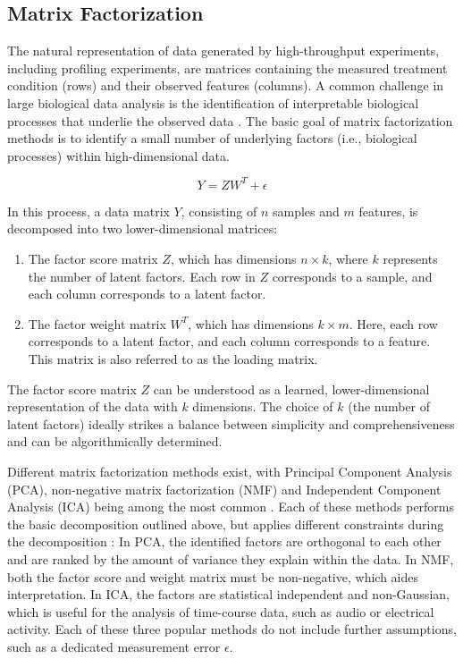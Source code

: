 \begin{flushleft}
\subsection{Matrix Factorization}
The natural representation of data generated by high-throughput experiments, including profiling experiments, are matrices containing the measured treatment condition (rows) and their observed features (columns). A common challenge in large biological data analysis is the identification of interpretable biological processes that underlie the observed data \parencite{stein-obrienEnterMatrixFactorization2018}. The basic goal of matrix factorization methods is to identify a small number of underlying factors (i.e., biological processes) within high-dimensional data. 

\begin{equation}
    Y = ZW^T + \epsilon
\end{equation}

In this process, a data matrix \( Y \), consisting of \( n \) samples and \( m \) features, is decomposed into two lower-dimensional matrices: 

\begin{enumerate}
    \item The factor score matrix \( Z \), which has dimensions \( n \times k \), where \( k \) represents the number of latent factors. Each row in \( Z \) corresponds to a sample, and each column corresponds to a latent factor.
    \item The factor weight matrix \( W^T \), which has dimensions \( k \times m \). Here, each row corresponds to a latent factor, and each column corresponds to a feature. This matrix is also referred to as the loading matrix. 
\end{enumerate}

The factor score matrix \( Z \) can be understood as a learned, lower-dimensional representation of the data with \( k \) dimensions. The choice of \( k \) (the number of latent factors) ideally strikes a balance between simplicity and comprehensiveness and can be algorithmically determined. 

Different matrix factorization methods exist, with Principal Component Analysis (PCA), non-negative matrix factorization (NMF) and Independent Component Analysis (ICA) being among the most common \parencite{stein-obrienEnterMatrixFactorization2018}. Each of these methods performs the basic decomposition outlined above, but applies different constraints during the decomposition \parencite{stein-obrienEnterMatrixFactorization2018}: In PCA, the identified factors are orthogonal to each other and are ranked by the amount of variance they explain within the data. In NMF, both the factor score and weight matrix must be non-negative, which aides interpretation. In ICA, the factors are statistical independent and non-Gaussian, which is useful for the analysis of time-course data, such as audio or electrical activity. Each of these three popular methods do not include further assumptions, such as a dedicated measurement error \(\epsilon\).


\end{flushleft}
